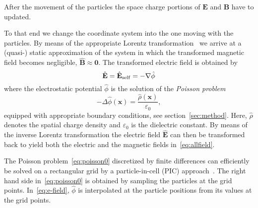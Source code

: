 After the movement of the particles the space charge portions of
$\mathbf{E}$ and $\mathbf{B}$ have to updated.  

To that end we change the coordinate system into the one moving with the
particles.  By means of the appropriate Lorentz
transformation~\cite{lali:84} we arrive at a (quasi-) static
approximation of the system in which the transformed magnetic field
becomes negligible, $\hat{\mathbf{B}}\! \approx\! \mathbf{0}$.  The
transformed electric field is obtained by
\begin{equation}\label{eq:e-field}
  \hat{\mathbf{E}}=\hat{\mathbf{E}}_{\RM{self}}=-\nabla\hat{\phi}
\end{equation}
where the electrostatic potential $\hat{\phi}$ is the solution of the
\emph{Poisson problem}
\begin{equation}\label{eq:poisson0}
  - \Delta \hat{\phi}(\mathbf{x}) =
  \frac{\hat{\rho}(\mathbf{x})}{\varepsilon_0},
\end{equation}
equipped with appropriate boundary conditions, see
section~\ref{sec:method}.  Here, $\hat{\rho}$ denotes the spatial charge
density and $\varepsilon_0$ is the dielectric constant.
By means of the inverse Lorentz transformation the electric field
$\hat{\mathbf{E}}$ can then be transformed back to yield both the
electric and the magnetic fields in~\eqref{eq:allfield}.  

The Poisson problem~\eqref{eq:poisson0} discretized by finite
differences can efficiently be solved on a rectangular grid by a
particle-in-cell (PIC) approach~\cite{qiry01}.  The right hand side
in~\eqref{eq:poisson0} is obtained by sampling the particles at the grid
points.  In~\eqref{eq:e-field}, $\hat{\phi}$ is interpolated at the
particle positions from its values at the grid points.

